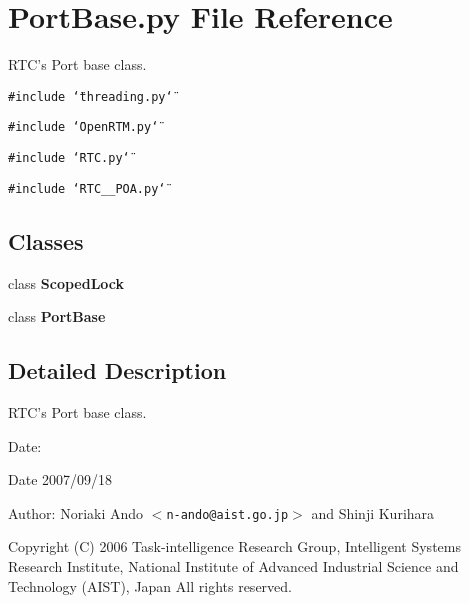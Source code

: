 \section{Port\-Base.py File Reference}
\label{PortBase_8py}
RTC's Port base class. 

{\tt \#include \char`\"{}threading.py\char`\"{}}\par
{\tt \#include \char`\"{}Open\-RTM.py\char`\"{}}\par
{\tt \#include \char`\"{}RTC.py\char`\"{}}\par
{\tt \#include \char`\"{}RTC\_\-\_\-POA.py\char`\"{}}\par
\subsection*{Classes}
\begin{CompactItemize}
\item 
class {\bf Scoped\-Lock}
\item 
class {\bf Port\-Base}
\end{CompactItemize}


\subsection{Detailed Description}
RTC's Port base class. 

\begin{Desc}
\item[Date:]\begin{Desc}
\item[Date]2007/09/18 \end{Desc}
\end{Desc}
\begin{Desc}
\item[Author:]Noriaki Ando $<${\tt n-ando@aist.go.jp}$>$ and Shinji Kurihara\end{Desc}
Copyright (C) 2006 Task-intelligence Research Group, Intelligent Systems Research Institute, National Institute of Advanced Industrial Science and Technology (AIST), Japan All rights reserved.